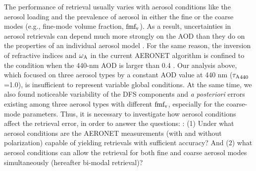 The performance of retrieval usually varies with aerosol conditions like
the aerosol loading and the prevalence of aerosol in either the fine or
the coarse modes (e.g., fine-mode volume fraction, $\text{fmf}_\text{v}$). As a result,
uncertainties in aerosol retrievals can depend much more strongly on the
AOD than they do on the properties of an individual aerosol model
\citep{Knobelspiesse12}. For the same reason, the inversion of
refractive indices and $\omega_\text{A}$ in the current AERONET algorithm is confined
to the condition when the 440-nm AOD is larger than 0.4
\citep{Dubovik00b, Holben06}. Our analysis above, which focused on three
aerosol types by a constant AOD value at 440 nm (${\tau_\text{A}}_{440}$=1.0), is
insufficient to represent variable global conditions. At the same time,
we also found noticeable variability of the DFS components and \textit{a
posteriori} errors existing among three aerosol types with different
$\text{fmf}_\text{v}$, especially for the coarse-mode parameters. Thus, it is necessary
to investigate how aerosol conditions affect the retrieval error, in
order to answer the questions: : (1) Under what aerosol conditions are
the AERONET measurements (with and without polarization) capable of
yielding retrievals with sufficient accuracy? And (2) what aerosol
conditions can allow the retrieval for both fine and coarse aerosol
modes simultaneously (hereafter bi-modal retrieval)?  

